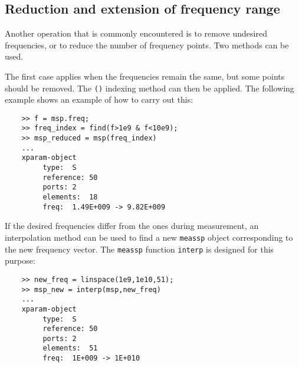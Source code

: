 \subsection{Reduction and extension of frequency range}
Another operation that is commonly encountered is to remove
undesired frequencies, or to reduce the number of frequency
points. Two methods can be used.

The first case applies when the frequencies remain the same, but
some points should be removed. The \verb"()" indexing method can
then be applied. The following example shows an example of how to
carry out this:

\begin{small}
\begin{verbatim}
    >> f = msp.freq;
    >> freq_index = find(f>1e9 & f<10e9);
    >> msp_reduced = msp(freq_index)
    ...
    xparam-object
    	 type:	S
    	 reference:	50
    	 ports:	2
    	 elements:	18
    	 freq:	1.49E+009 -> 9.82E+009
\end{verbatim}
\end{small}

If the desired frequencies differ from the ones during
measurement, an interpolation method can be used to find a new
\verb"meassp" object corresponding to the new frequency vector.
The \verb"meassp" function \verb"interp" is designed for this
purpose:

\begin{small}
\begin{verbatim}
    >> new_freq = linspace(1e9,1e10,51);
    >> msp_new = interp(msp,new_freq)
    ...
    xparam-object
    	 type:	S
    	 reference:	50
    	 ports:	2
    	 elements:	51
    	 freq:	1E+009 -> 1E+010
\end{verbatim}
\end{small}
